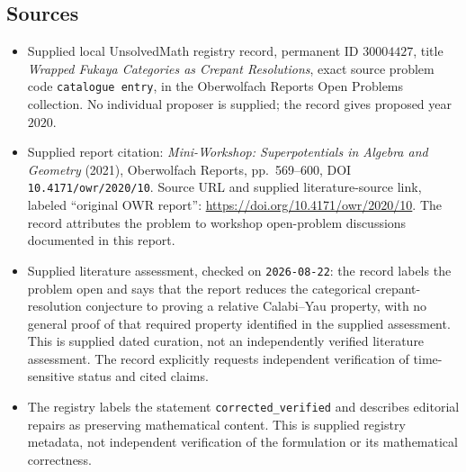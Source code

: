 \documentclass[11pt]{article}
\begin{document}
\subsection{Sources}
\begin{itemize}
\item Supplied local UnsolvedMath registry record, permanent ID \(30004427\), title \emph{Wrapped Fukaya Categories as Crepant Resolutions}, exact source problem code \texttt{catalogue entry}, in the Oberwolfach Reports Open Problems collection. No individual proposer is supplied; the record gives proposed year \(2020\).
\item Supplied report citation: \emph{Mini-Workshop: Superpotentials in Algebra and Geometry} (2021), Oberwolfach Reports, pp.\ 569--600, DOI \texttt{10.4171/owr/2020/10}. Source URL and supplied literature-source link, labeled ``original OWR report'': \url{https://doi.org/10.4171/owr/2020/10}. The record attributes the problem to workshop open-problem discussions documented in this report.
\item Supplied literature assessment, checked on \texttt{2026-08-22}: the record labels the problem open and says that the report reduces the categorical crepant-resolution conjecture to proving a relative Calabi--Yau property, with no general proof of that required property identified in the supplied assessment. This is supplied dated curation, not an independently verified literature assessment. The record explicitly requests independent verification of time-sensitive status and cited claims.
\item The registry labels the statement \texttt{corrected\_verified} and describes editorial repairs as preserving mathematical content. This is supplied registry metadata, not independent verification of the formulation or its mathematical correctness.
\end{itemize}
\end{document}

